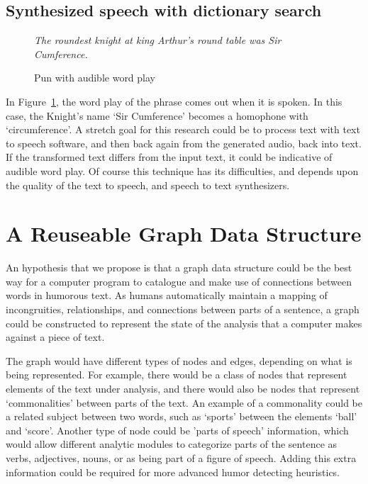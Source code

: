 \subsection{Synthesized speech with dictionary search}
\begin{figure}[h]
\begin{mdframed}
  \emph{The roundest knight at king Arthur's round table was Sir Cumference.}
  \caption{Pun with audible word play}
 \label{sircumference}
\end{mdframed}
\end{figure}

In Figure~\ref{sircumference}, the word play of the phrase comes out when it is spoken. In this case, the Knight's name `Sir Cumference' becomes a homophone with `circumference'.
A stretch goal for this research could be to process text with text to speech software, and then back again from the generated audio, back into text. If the transformed text
differs from the input text, it could be indicative of audible word play. Of course this technique has its difficulties, and depends upon the quality of the text to speech, and speech to text synthesizers.

\section{A Reuseable Graph Data Structure}

An hypothesis that  we propose is that a graph data structure could be the best way for a computer program to catalogue and make use of connections between words in humorous text. As humans automatically maintain a mapping of incongruities, relationships, and connections between parts of a sentence, a graph could be constructed to represent the state of the analysis that a computer makes against a piece of text. 

The graph would have different types of nodes and edges, depending on what is being represented. For example, there would be a class of nodes that represent elements of the text under analysis, and there would also be nodes that represent `commonalities' between parts of the text. An example of a commonality could be a related subject between two words, such as `sports' between the elements `ball' and `score'. Another type of node could be 'parts of speech' information, which would allow different analytic modules to categorize parts of the sentence as verbs, adjectives, nouns, or as being part of a figure of speech. Adding this extra information could be required for more advanced humor detecting heuristics.

